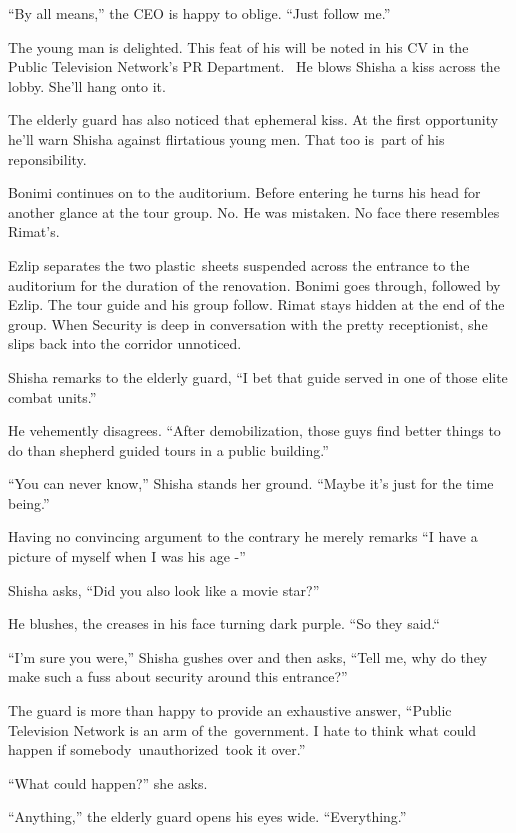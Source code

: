 \documentclass[twoside,11pt]{book}
\begin{document}
``By all means,'' the CEO is happy to oblige. ``Just follow me.''

The young man is delighted. This feat of his will be noted in his CV in the Public Television Network's PR Department.
~He blows Shisha a kiss across the lobby. She'll hang onto it.

The elderly guard has also noticed that ephemeral kiss. \MakeUppercase{A}t the first opportunity he'll warn Shisha
against flirtatious young men. That too is~part of his reponsibility.

Bonimi continues on to the auditorium. Before entering he turns his head for another glance at the tour group. No. He
was mistaken. No face there resembles Rimat's.

Ezlip separates the two plastic~sheets suspended across the entrance to the auditorium for the duration of the
renovation. Bonimi goes through, followed by Ezlip. The tour guide and his group follow. Rimat stays hidden at the end
of the group. When Security is deep in conversation with the pretty receptionist, she slips back into the corridor
unnoticed.

Shisha remarks to the elderly guard, ``I bet that guide served in one of those elite combat
units.'' \

He vehemently disagrees. ``After demobilization, those guys find better things to do than shepherd guided
tours in a public building.''

``You can never know,'' Shisha stands her ground. ``Maybe it's just for the time
being.''

Having no convincing argument to the contrary he merely remarks ``I have a picture of myself when I was his
age -'' \

Shisha asks, ``Did you also look like a movie star?''

He blushes, the creases in his face turning dark purple. ``So they said.``~

``I'm sure you were,'' Shisha gushes over and then asks, ``Tell me, why do they
make such a fuss about security around this entrance?''

The guard is more than happy to provide an exhaustive answer, ``Public Television Network is an arm of
the~government. I hate to think what could happen if somebody~unauthorized~took it over.''

``What could happen?'' she asks.

``Anything,'' the elderly guard opens his eyes wide. ``Everything.''

~
\end{document}
